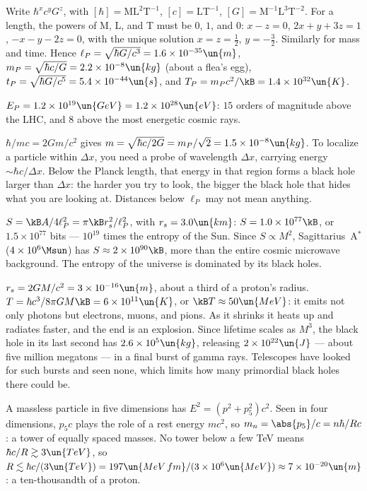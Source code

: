 
 Write $\hbar^xc^yG^z$, with $[\hbar] = \mathrm{ML^2T^{-1}}$, $[c] = \mathrm{LT^{-1}}$, $[G] = \mathrm{M^{-1}L^3T^{-2}}$. For a length, the powers of M, L, and T must be $0$, $1$, and $0$: $x - z = 0$, $2x+y+3z = 1$, $-x-y-2z = 0$, with the unique solution $x = z = \tfrac12$, $y = -\tfrac32$. Similarly for mass and time. Hence $\ell_P = \sqrt{\hbar G/c^3} = 1.6\times10^{-35}\un{m}$, $m_P = \sqrt{\hbar c/G} = 2.2\times10^{-8}\un{kg}$ (about a flea's egg), $t_P = \sqrt{\hbar G/c^5} = 5.4\times10^{-44}\un{s}$, and $T_P = m_Pc^2/\kB = 1.4\times10^{32}\un{K}$.

 $E_P = 1.2\times10^{19}\un{GeV} = 1.2\times10^{28}\un{eV}$: $15$ orders of magnitude above the LHC, and $8$ above the most energetic cosmic rays.

 $\hbar/mc = 2Gm/c^2$ gives $m = \sqrt{\hbar c/2G} = m_P/\sqrt2 = 1.5\times10^{-8}\un{kg}$. To localize a particle within $\Delta x$, you need a probe of wavelength $\Delta x$, carrying energy $\sim\hbar c/\Delta x$. Below the Planck length, that energy in that region forms a black hole larger than $\Delta x$: the harder you try to look, the bigger the black hole that hides what you are looking at. Distances below $\ell_P$ may not mean anything.

 $S = \kB A/4\ell_P^2 = \pi\kB r_s^2/\ell_P^2$, with $r_s = 3.0\un{km}$: $S = 1.0\times10^{77}\kB$, or $1.5\times10^{77}$ bits --- $10^{19}$ times the entropy of the Sun. Since $S\propto M^2$, Sagittarius~A$^*$ ($4\times10^6\Msun$) has $S\approx2\times10^{90}\kB$, more than the entire cosmic microwave background. The entropy of the universe is dominated by its black holes.

 $r_s = 2GM/c^2 = 3\times10^{-16}\un{m}$, about a third of a proton's radius. $T = \hbar c^3/8\pi GM\kB = 6\times10^{11}\un{K}$, or $\kB T\approx50\un{MeV}$: it emits not only photons but electrons, muons, and pions. As it shrinks it heats up and radiates faster, and the end is an explosion. Since lifetime scales as $M^3$, the black hole in its last second has $2.6\times10^5\un{kg}$, releasing $2\times10^{22}\un{J}$ --- about five million megatons --- in a final burst of gamma rays. Telescopes have looked for such bursts and seen none, which limits how many primordial black holes there could be.

 A massless particle in five dimensions has $E^2 = (p^2 + p_5^2)c^2$. Seen in four dimensions, $p_5c$ plays the role of a rest energy $mc^2$, so $m_n = \abs{p_5}/c = n\hbar/Rc$: a tower of equally spaced masses. No tower below a few TeV means $\hbar c/R\gtrsim3\un{TeV}$, so $R\lesssim\hbar c/(3\un{TeV}) = 197\un{MeV\,fm}/(3\times10^6\un{MeV})\approx7\times10^{-20}\un{m}$: a ten-thousandth of a proton.

